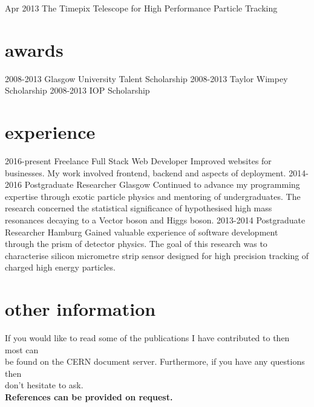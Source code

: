 \documentclass[]{twentysecondcv}
\begin{document}
\begin{twentyshort}
  \twentyitemshort
    {Apr 2013}
    {The Timepix Telescope for High Performance Particle Tracking }
\end{twentyshort}



\section{awards}

\begin{twentyshort}
  \twentyitemshort
    {2008-2013}
    {Glasgow University Talent Scholarship }
  \twentyitemshort
    {2008-2013}
    {Taylor Wimpey Scholarship }
  \twentyitemshort
    {2008-2013}
    {IOP Scholarship}
\end{twentyshort}


\section{experience}

\begin{twenty}
  \twentyitem
    {2016-present}
    {Freelance Full Stack Web Developer}
    {}
    {Improved websites for businesses. My work involved frontend, backend and aspects of deployment.}
  \twentyitem
    {2014-2016}
    {Postgraduate Researcher}
    {Glasgow}
    {Continued to advance my programming expertise through exotic particle physics and mentoring of undergraduates.  The research concerned the  statistical significance of hypothesised high mass resonances decaying to a Vector boson and Higgs boson.}
\twentyitem
    {2013-2014}
    {Postgraduate Researcher}
    {Hamburg}
    {Gained valuable experience of software development through the prism of detector physics.  The goal of this research was to  characterise silicon micrometre strip sensor designed for high precision tracking of charged high energy particles.}

\end{twenty}
\section{other information}
\hspace*{5pt}
If you would like to read some of the publications I have contributed to then most can \\ \hspace*{5pt} be found on the CERN document server. Furthermore, if you have any questions then \\ \hspace*{5pt} don't hesitate to ask. \\ 
\hspace*{5pt}
\vspace*{2pt}
\bf{References can be provided on request.} 

\end{document}
